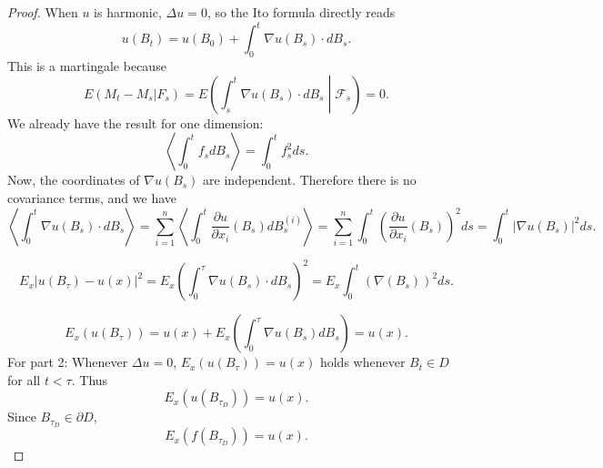 \begin{proof}
	When $u$ is harmonic, $\Delta u = 0$, so the Ito formula directly reads
	\[
u\left(B_t\right)=u\left(B_0\right)+\int_0^t \nabla u\left(B_s\right) \cdot d B_s
	.\] 
	This is a martingale because
	\[
		E(M_t - M_s | F_s) = E\left( \int _s^t \nabla u (B_s) \cdot  d B_s \middle| \mathcal{F}_s \right)  = 0
	.\] 
	We already have the result for one dimension:
	\[
		\left\langle \int _0^t f_s d B_s \right\rangle  = \int _0^t f_s^2 ds
	.\] 
	Now, the coordinates of $\nabla u (B_s)$ are independent. Therefore there is no covariance terms, and we have
	\[
		\left\langle \int _0^t \nabla u (B_s) \cdot d B_s \right\rangle 
		= \sum_{i= 1}^n \left\langle \int _0^t \frac{\partial u}{\partial x_i} (B_s) d B_s^{(i)} \right\rangle
		= \sum_{i= 1}^n  \int _0^t \left(\frac{\partial u}{\partial x_i} (B_s)\right)^2 d s 
		= \int _0^t \left| \nabla u (B_s) \right| ^2 ds
	.\] 
	
	\[
		E_x \left| u(B_\tau) - u(x) \right| ^2
		= E_x \left( \int _0^\tau \nabla u (B_s) \cdot  d B_s \right) ^2
		= E_x \int _0^t \left( \nabla  (B_s) \right) ^2 ds
	.\] 
	
	\[
		E_x\left( u(B_\tau) \right) = u(x) + E_x\left( \int _0^\tau \nabla u (B_s) d B_s \right) = u(x)
	.\] 
	For part 2:
	Whenever $\Delta u =0$, $E_x(u(B_\tau)) = u(x)$ holds whenever $B_t \in D$ for all $t < \tau$. 
	Thus
	\[
		E_x(u(B_{\tau_D})) = u(x)
	.\] 
	Since $B_{\tau_D} \in \partial D$, 
	\[
		E_x(f(B_{\tau_D})) = u(x)
	.\] 
\end{proof}

